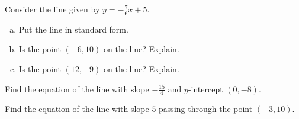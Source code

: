\documentclass[11pt,letterpaper]{article}
\begin{document}
\newpage



 Consider the line given by $y= -\frac{7}{6}x + 5$.
\begin{enumerate}[(a)]
\item Put the line in standard form.
\item Is the point $(-6, 10)$ on the line? Explain.
\item Is the point $(12, -9)$ on the line? Explain. 
\end{enumerate}



\newpage



 Find the equation of the line with slope $-\frac{15}{4}$ and $y$-intercept $(0, -8)$. \pspace



\newpage



 Find the equation of the line with slope $5$ passing through the point $(-3, 10)$. \pspace
\end{document}
